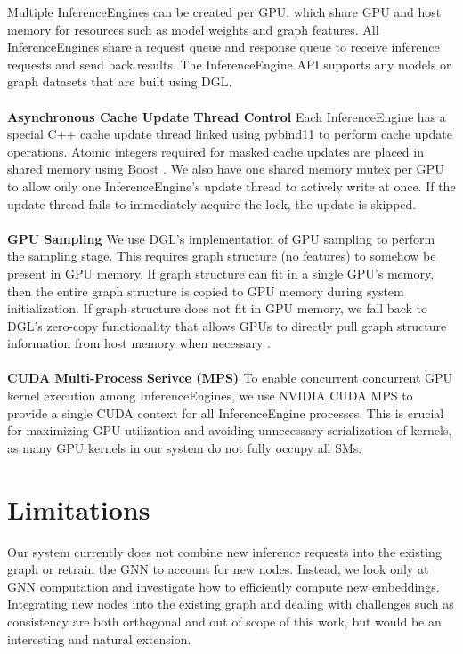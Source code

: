 Multiple InferenceEngines can be created per GPU, which share GPU and host memory for resources such as model weights and graph features. All InferenceEngines share a request queue and response queue to receive inference requests and send back results. The InferenceEngine API supports any models or graph datasets that are built using DGL.
\\ \\ 
\noindent \textbf{Asynchronous Cache Update Thread Control} \quad Each InferenceEngine has a special C++ cache update thread linked using pybind11 \cite{pybind11} to perform cache update operations. Atomic integers required for masked cache updates are placed in shared memory using Boost \cite{BoostLibrary}. We also have one shared memory mutex per GPU to allow only one InferenceEngine's update thread to actively write at once. If the update thread fails to immediately acquire the lock, the update is skipped.
\\ \\
\noindent \textbf{GPU Sampling} \quad We use DGL's implementation of GPU sampling to perform the sampling stage. This requires graph structure (no features) to somehow be present in GPU memory. If graph structure can fit in a single GPU's memory, then the entire graph structure is copied to GPU memory during system initialization. If graph structure does not fit in GPU memory, we fall back to DGL's zero-copy functionality that allows GPUs to directly pull graph structure information from host memory when necessary \cite{PyTorch_Direct_2021}. 
\\ \\
\noindent \textbf{CUDA Multi-Process Serivce (MPS) \cite{CUDA_MPS}} \quad
To enable concurrent concurrent GPU kernel execution among InferenceEngines, we use NVIDIA CUDA MPS to provide a single CUDA context for all InferenceEngine processes. This is crucial for maximizing GPU utilization and avoiding unnecessary serialization of kernels, as many GPU kernels in our system do not fully occupy all SMs.

\section{Limitations}
Our system currently does not combine new inference requests into the existing graph or retrain the GNN to account for new nodes. 
Instead, we look only at GNN computation and investigate how to efficiently compute new embeddings. 
Integrating new nodes into the existing graph and dealing with challenges such as consistency are both orthogonal and out of scope of this work, but would be an interesting and natural extension.
